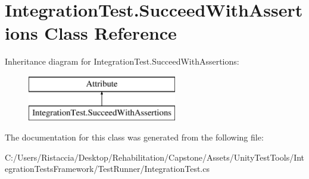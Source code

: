 \hypertarget{class_integration_test_1_1_succeed_with_assertions}{}\section{Integration\+Test.\+Succeed\+With\+Assertions Class Reference}
\label{class_integration_test_1_1_succeed_with_assertions}
Inheritance diagram for Integration\+Test.\+Succeed\+With\+Assertions\+:\begin{figure}[H]
\begin{center}
\leavevmode
\includegraphics[height=2.000000cm]{class_integration_test_1_1_succeed_with_assertions}
\end{center}
\end{figure}


The documentation for this class was generated from the following file\+:\begin{DoxyCompactItemize}
\item 
C\+:/\+Users/\+Ristaccia/\+Desktop/\+Rehabilitation/\+Capstone/\+Assets/\+Unity\+Test\+Tools/\+Integration\+Tests\+Framework/\+Test\+Runner/Integration\+Test.\+cs\end{DoxyCompactItemize}
